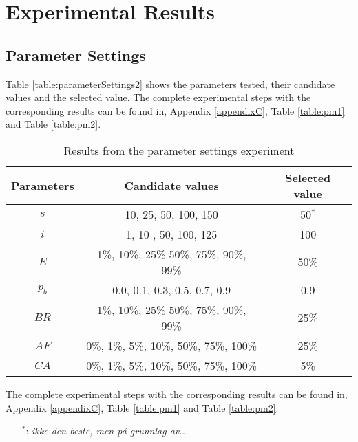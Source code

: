 \section{Experimental Results}
\label{sec:expResults}

\subsection{Parameter Settings}
\label{subsec:parameterSettings_results}

Table \vref{table:parameterSettings2} shows the parameters tested, their candidate values and the selected value. The complete experimental steps with the corresponding results can be found in, Appendix \ref{appendixC}, Table \vref{table:pm1} and Table \vref{table:pm2}. 
    \begin{table}[H]
    \centering
    \begin{tabular}{|c|c||c|}
    \hline
    Parameters & Candidate values & Selected value\\
    \hline
    $s$ & 10, 25, 50, 100, 150 & 50$^*$ \\
    $i$ & 1, 10 , 50, 100, 125 & 100 \\
    $E$ & 1\%, 10\%, 25\% 50\%, 75\%, 90\%, 99\% & 50\% \\
    $p_{b}$ & 0.0, 0.1, 0.3, 0.5, 0.7, 0.9 & 0.9 \\
    $BR$ & 1\%, 10\%, 25\% 50\%, 75\%, 90\%, 99\% & 25\% \\
    $AF$ & 0\%, 1\%, 5\%, 10\%, 50\%, 75\%, 100\% & 25\% \\
    $CA$ & 0\%, 1\%, 5\%, 10\%, 50\%, 75\%, 100\% & 5\% \\
    \hline
    \end{tabular}
    \caption {Results from the parameter settings experiment}
    The complete experimental steps with the corresponding results can be found in, Appendix \ref{appendixC}, Table \vref{table:pm1} and Table \vref{table:pm2}.
    \begin{itemize}[noitemsep]
    \item[$^*$:] \emph{\color{red} ikke den beste, men på grunnlag av..}
    \end{itemize}
    \label{table:parameterSettings2}
    \end{table}


